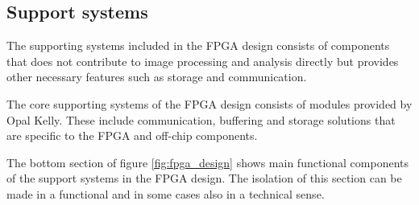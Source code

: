 \documentclass[12pt]{report}
\begin{document}
\subsection{Support systems}
The supporting systems included in the FPGA design consists of components that does not contribute to image processing and analysis directly but provides other necessary features such as storage and communication. 
\par
The core supporting systems of the FPGA design consists of modules provided by Opal Kelly. These include communication, buffering and storage solutions that are specific to the FPGA and off-chip components. 
\par
The bottom section of figure \ref*{fig:fpga_design} shows main functional components of the support systems in the FPGA design. The isolation of this section can be made in a functional and in some cases also in a technical sense.
\end{document}
